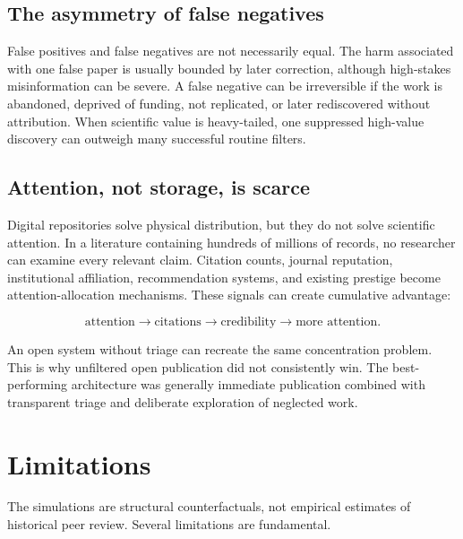 \documentclass[11pt]{article}
\begin{document}
\subsection{The asymmetry of false negatives}

False positives and false negatives are not necessarily equal. The harm associated with one false paper is usually bounded by later correction, although high-stakes misinformation can be severe. A false negative can be irreversible if the work is abandoned, deprived of funding, not replicated, or later rediscovered without attribution. When scientific value is heavy-tailed, one suppressed high-value discovery can outweigh many successful routine filters.

\subsection{Attention, not storage, is scarce}

Digital repositories solve physical distribution, but they do not solve scientific attention. In a literature containing hundreds of millions of records, no researcher can examine every relevant claim. Citation counts, journal reputation, institutional affiliation, recommendation systems, and existing prestige become attention-allocation mechanisms. These signals can create cumulative advantage:

\begin{equation}
\text{attention}\rightarrow\text{citations}\rightarrow\text{credibility}
\rightarrow\text{more attention}.
\end{equation}

An open system without triage can recreate the same concentration problem. This is why unfiltered open publication did not consistently win. The best-performing architecture was generally immediate publication combined with transparent triage and deliberate exploration of neglected work.

\section{Limitations}

The simulations are structural counterfactuals, not empirical estimates of historical peer review. Several limitations are fundamental.
\end{document}
